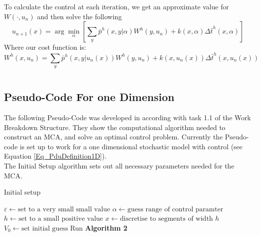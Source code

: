 \documentclass[11pt,draftd]{article}
\begin{document}
To calculate the control at each iteration, we get an approximate value for $ W(\cdot,u_n) $ and then solve the following
\begin{equation}
u_{n+1}(x) = \arg\min_{\alpha}\left[\sum_{y}\bar{p}^{h}(x,y|\alpha)W^{h}(y,u_{n}) + k(x,\alpha) \Delta\bar{t}^{h}(x,\alpha)\right]
\end{equation}
Where our cost function is:
\begin{equation}
W^{h}(x, u_{n}) = \sum_{y}\bar{p}^{h}(x,y|u_{n}(x))W^{h}(y,u_{n}) + k(x,u_{n}(x)) \Delta\bar{t}^{h}(x,u_{n}(x))
\end{equation}

\[\]
\subsection{Pseudo-Code For one Dimension}
The following Pseudo-Code was developed in according with task 1.1 of the Work Breakdown Structure. They show the computational algorithm needed to construct an MCA, and solve an optimal control problem. Currently the Pseudo-code is set up to work for a one dimensional stochastic model with control (see Equation \eqref{Eq_PduDefinition1D}). \\

The Initial Setup algorithm sets out all necessary parameters needed for the MCA.

\begin{algorithm}[H]
	\label{alg-setup}
	\caption{Initial setup}
	\begin{algorithmic}[1]
		\State $\varepsilon \gets \text{set to a very small small value}$
		\State $\alpha \gets \text{guess range of control paramter} $
		\State $h \gets \text{set to a small positive value} $
		\State $ x \gets \text{discretise to segments of width } h$
		\State $ V_0 \gets \text{set initial guess} $
		\State Run \textbf{Algorithm 2}
		\EndProcedure{}
	\end{algorithmic}
\end{algorithm}
\end{document}
